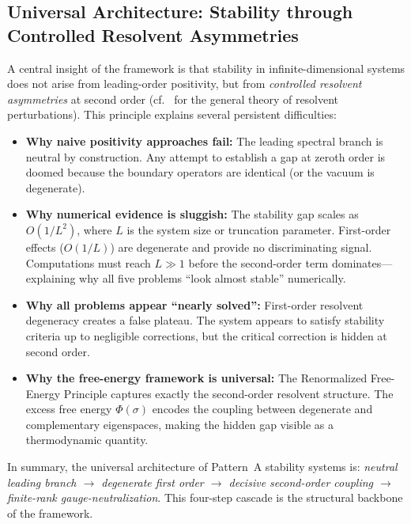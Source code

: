 \documentclass[12pt,a4paper]{article}
\theoremstyle{definition}
\theoremstyle{remark}
\begin{document}
\subsection{Universal Architecture: Stability through Controlled Resolvent Asymmetries}
\label{sec:universal-architecture}

A central insight of the framework is that stability in infinite-dimensional systems does not arise from leading-order positivity, but from \emph{controlled resolvent asymmetries} at second order (cf.~\cite{Kato1995} for the general theory of resolvent perturbations). This principle explains several persistent difficulties:

\begin{itemize}
    \item \textbf{Why naive positivity approaches fail:} The leading spectral branch is neutral by construction. Any attempt to establish a gap at zeroth order is doomed because the boundary operators are identical (or the vacuum is degenerate).

    \item \textbf{Why numerical evidence is sluggish:} The stability gap scales as $O(1/L^2)$, where $L$ is the system size or truncation parameter. First-order effects ($O(1/L)$) are degenerate and provide no discriminating signal. Computations must reach $L \gg 1$ before the second-order term dominates---explaining why all five problems ``look almost stable'' numerically.

    \item \textbf{Why all problems appear ``nearly solved'':} First-order resolvent degeneracy creates a false plateau. The system appears to satisfy stability criteria up to negligible corrections, but the critical correction is hidden at second order.

    \item \textbf{Why the free-energy framework is universal:} The Renormalized Free-Energy Principle captures exactly the second-order resolvent structure. The excess free energy $\Phi(\sigma)$ encodes the coupling between degenerate and complementary eigenspaces, making the hidden gap visible as a thermodynamic quantity.
\end{itemize}

\noindent
In summary, the universal architecture of Pattern~A stability systems is: \emph{neutral leading branch $\to$ degenerate first order $\to$ decisive second-order coupling $\to$ finite-rank gauge-neutralization}. This four-step cascade is the structural backbone of the framework.
\end{document}
